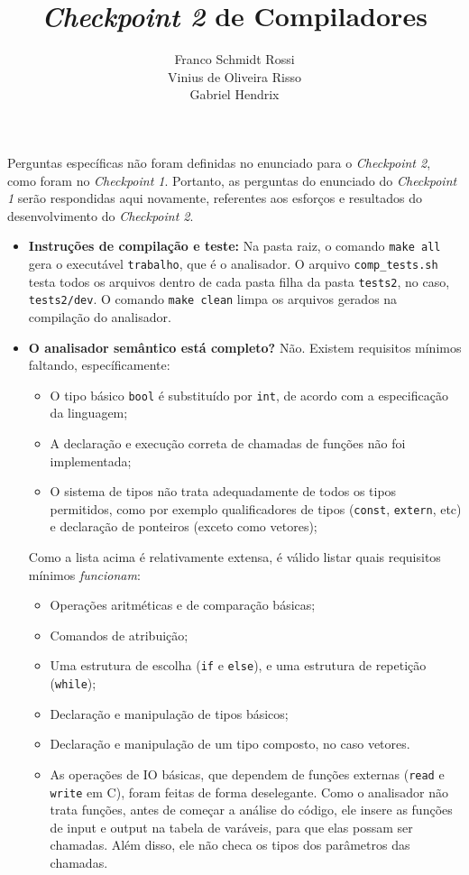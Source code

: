 \documentclass[a4paper] {article}
\author {Franco Schmidt Rossi\\Vinius de Oliveira Risso\\Gabriel Hendrix}
\title{\textit{Checkpoint 2} de Compiladores}
\begin{document}
\maketitle {}

Perguntas específicas não foram definidas no enunciado para o \textit{Checkpoint 2}, como foram no \textit{Checkpoint 1}. Portanto, as perguntas do enunciado do \textit{Checkpoint 1} serão respondidas aqui novamente, referentes aos esforços e resultados do desenvolvimento do \textit{Checkpoint 2}.

\begin{itemize}
	\item \textbf{Instru\c{c}\~{o}es de compila\c{c}\~{a}o e teste:} Na pasta raiz, o comando \texttt{make all} gera o execut\'{a}vel \texttt{trabalho}, que \'{e} o analisador. O arquivo \texttt{comp\_tests.sh} testa todos os arquivos dentro de cada pasta filha da pasta \texttt{tests2}, no caso, \texttt{tests2/dev}. O comando \texttt{make clean} limpa os arquivos gerados na compila\c{c}\~{a}o do analisador.
	\item \textbf{O analisador semântico está completo?} Não. Existem requisitos mínimos faltando, específicamente:
	\begin{itemize}
		\item O tipo básico \texttt{bool} é substituído por \texttt{int}, de acordo com a especificação da linguagem;
		\item A declaração e execução correta de chamadas de funções não foi implementada;
		\item O sistema de tipos não trata adequadamente de todos os tipos permitidos, como por exemplo qualificadores de tipos (\texttt{const}, \texttt{extern}, etc) e declaração de ponteiros (exceto como vetores);
	\end{itemize}
	Como a lista acima é relativamente extensa, é válido listar quais requisitos mínimos \textit{funcionam}:
	\begin{itemize}
		\item Operações aritméticas e de comparação básicas;
		\item Comandos de atribuição;
		\item Uma estrutura de escolha (\texttt{if} e \texttt{else}), e uma estrutura de repetição (\texttt{while});
		\item Declaração e manipulação de tipos básicos;
		\item Declaração e manipulação de um tipo composto, no caso vetores.
		\item As operações de IO básicas, que dependem de funções externas (\texttt{read} e \texttt{write} em C), foram feitas de forma deselegante. Como o analisador não trata funções, antes de começar a análise do código, ele insere as funções de input e output na tabela de varáveis, para que elas possam ser chamadas. Além disso, ele não checa os tipos dos parâmetros das chamadas.

\end{itemize}
\end{itemize}
\end{document}
